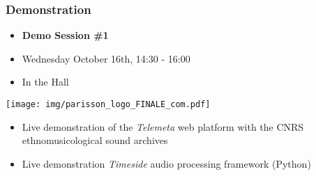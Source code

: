 \documentclass[final, hyperref, table]{beamer}
\begin{document}
\begin{frame}
  \frametitle{Demonstration}
 
  \begin{itemize}
  \item \textbf{Demo Session \#1}
  \item \alert{Wednesday} October 16th, 14:30 - 16:00
  \item In the Hall
  \end{itemize}
 \begin{center}
    \texttt{[image: img/parisson\_logo\_FINALE\_com.pdf]}
  \end{center}

  \begin{itemize}
  \item Live demonstration of the \emph{Telemeta} web platform with the CNRS ethnomusicological sound archives
  \item Live demonstration \emph{Timeside} audio processing framework (Python)
  \end{itemize}
\end{frame}
\end{document}
